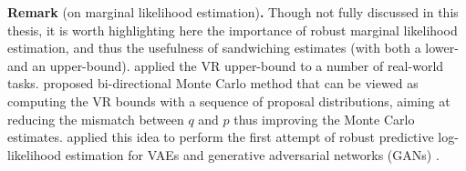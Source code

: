 \vspace{1em}
\begin{tcolorbox}
\textbf{Remark} (on marginal likelihood estimation)\textbf{.}
Though not fully discussed in this thesis, it is worth highlighting here the importance of robust marginal likelihood estimation, and thus the usefulness of sandwiching estimates (with both a lower- and an upper-bound). \citet{dieng:chi2016} applied the VR upper-bound to a number of real-world tasks. \cite{grosse:bidirectional2015, grosse:bidirectional2016} proposed bi-directional Monte Carlo method that can be viewed as computing the VR bounds with a sequence of proposal distributions, aiming at reducing the mismatch between $q$ and $p$ thus improving the Monte Carlo estimates. \cite{wu:quantitative2017} applied this idea to perform the first attempt of robust predictive log-likelihood estimation for VAEs and generative adversarial networks (GANs) \citep{goodfellow:gan2014}.   
\end{tcolorbox}
%
